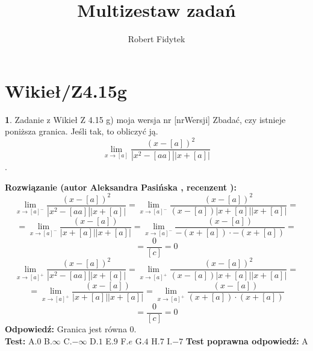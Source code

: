 \documentclass[12pt, a4paper]{article}
\title{Multizestaw zadań}
\author{Robert Fidytek}
\date{}
\theoremstyle{definition} %
\newtheorem{zad}{}
\newcommand{\kategoria}[1]{\section{#1}} %
\newcommand{\zadStart}[1]{\begin{zad}#1\newline} %
\newcommand{\zadStop}{\end{zad}}   %
\newcommand{\rozwStart}[2]{\noindent \textbf{Rozwiązanie (autor #1 , recenzent #2): }\newline} %
\newcommand{\rozwStop}{\newline}                                            %
\newcommand{\odpStart}{\noindent \textbf{Odpowiedź:}\newline}    %
\newcommand{\odpStop}{\newline}                                             %
\newcommand{\testStart}{\noindent \textbf{Test:}\newline} %
\newcommand{\testStop}{\newline} %
\newcommand{\kluczStart}{\noindent \textbf{Test poprawna odpowiedź:}\newline} %
\newcommand{\kluczStop}{\newline} %
\begin{document}
\maketitle


\kategoria{Wikieł/Z4.15g}
\zadStart{Zadanie z Wikieł Z 4.15 g) moja wersja nr [nrWersji]}
Zbadać, czy istnieje poniższa granica. Jeśli tak, to obliczyć ją. $$\lim_{x\rightarrow [a]}\frac{(x-[a])^2}{|x^2-[aa]||x+[a]|}$$.
\zadStop
\rozwStart{Aleksandra Pasińska}{}
$$\lim_{x\rightarrow [a]^-}\frac{(x-[a])^2}{|x^2-[aa]||x+[a]|}=\lim_{x\rightarrow [a]^-}\frac{(x-[a])^2}{(x-[a])|x+[a]||x+[a]|}=$$
$$=\lim_{x\rightarrow [a]^-}\frac{(x-[a])}{|x+[a]||x+[a]|}=\lim_{x\rightarrow [a]^-}\frac{(x-[a])}{-(x+[a])\cdot-(x+[a])}=$$
$$=\frac{0}{[c]}=0$$
$$\lim_{x\rightarrow [a]^+}\frac{(x-[a])^2}{|x^2-[aa]||x+[a]|}=\lim_{x\rightarrow [a]^+}\frac{(x-[a])^2}{(x-[a])|x+[a]||x+[a]|}=$$
$$=\lim_{x\rightarrow [a]^+}\frac{(x-[a])}{|x+[a]||x+[a]|}=\lim_{x\rightarrow [a]^+}\frac{(x-[a])}{(x+[a])\cdot(x+[a])}$$ $$=\frac{0}{[c]}=0$$
\rozwStop
\odpStart
Granica jest równa 0.\\
\odpStop
\testStart
A.$0$
B.$\infty$
C.$-\infty$
D.$1$
E.$9$
F.$e$
G.$4$
H.$7$
I.$-7$
\testStop
\kluczStart
A
\kluczStop
\end{document}
